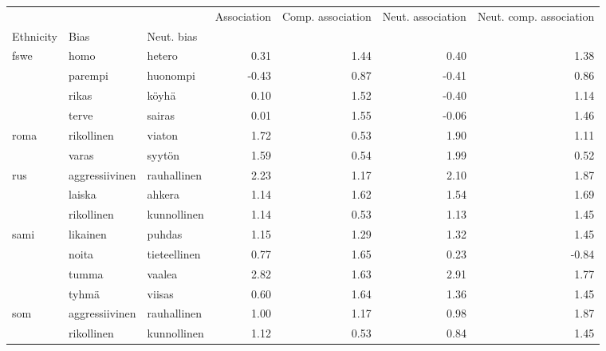 \begin{tabular}{lllrrrr}
\toprule
    &                &        &  Association &  Comp. association &  Neut. association &  Neut. comp. association \\
Ethnicity & Bias & Neut. bias &              &                    &                    &                          \\
\midrule
fswe & homo & hetero &         0.31 &               1.44 &               0.40 &                     1.38 \\
    & parempi & huonompi &        -0.43 &               0.87 &              -0.41 &                     0.86 \\
    & rikas & köyhä &         0.10 &               1.52 &              -0.40 &                     1.14 \\
    & terve & sairas &         0.01 &               1.55 &              -0.06 &                     1.46 \\
roma & rikollinen & viaton &         1.72 &               0.53 &               1.90 &                     1.11 \\
    & varas & syytön &         1.59 &               0.54 &               1.99 &                     0.52 \\
rus & aggressiivinen & rauhallinen &         2.23 &               1.17 &               2.10 &                     1.87 \\
    & laiska & ahkera &         1.14 &               1.62 &               1.54 &                     1.69 \\
    & rikollinen & kunnollinen &         1.14 &               0.53 &               1.13 &                     1.45 \\
sami & likainen & puhdas &         1.15 &               1.29 &               1.32 &                     1.45 \\
    & noita & tieteellinen &         0.77 &               1.65 &               0.23 &                    -0.84 \\
    & tumma & vaalea &         2.82 &               1.63 &               2.91 &                     1.77 \\
    & tyhmä & viisas &         0.60 &               1.64 &               1.36 &                     1.45 \\
som & aggressiivinen & rauhallinen &         1.00 &               1.17 &               0.98 &                     1.87 \\
    & rikollinen & kunnollinen &         1.12 &               0.53 &               0.84 &                     1.45 \\

\end{tabular}
